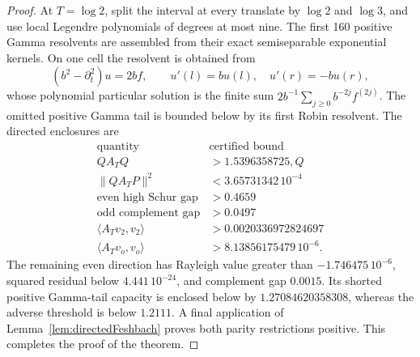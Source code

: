 \documentclass[11pt]{amsart}
\theoremstyle{definition}
\theoremstyle{remark}
\begin{document}
\begin{proof}
At \(T=\log2\), split the interval at every translate by \(\log2\) and
\(\log3\), and use local Legendre polynomials of degrees at most nine.
The first 160 positive Gamma resolvents are assembled from their exact
semiseparable exponential kernels.  On one cell the resolvent is obtained
from
\[
 (b^2-\partial_t^2)u=2bf,\qquad
 u'(l)=bu(l),\quad u'(r)=-bu(r),
\]
whose polynomial particular solution is the finite sum
\(2b^{-1}\sum_{j\ge0}b^{-2j}f^{(2j)}\).  The omitted positive Gamma tail is
bounded below by its first Robin resolvent.  The directed enclosures are
\[
\begin{array}{c|c}
\text{quantity}&\text{certified bound}\\ \hline
 QA_TQ&>1.5396358725,Q\\
 \|QA_TP\|^2&<3.65731342\,10^{-4}\\
 \text{even high Schur gap}&>0.4659\\
 \text{odd complement gap}&>0.0497\\
 \langle A_Tv_2,v_2\rangle&>0.0020336972824697\\
 \langle A_Tv_o,v_o\rangle&>8.13856175479\,10^{-6}.
\end{array}
\]
The remaining even direction has Rayleigh value greater than
\(-1.746475\,10^{-6}\), squared residual below
\(4.441\,10^{-24}\), and complement gap \(0.0015\).  Its shorted positive
Gamma-tail capacity is enclosed below by \(1.27084620358308\), whereas the
adverse threshold is below \(1.2111\).  A final application of
Lemma~\ref{lem:directedFeshbach} proves both parity restrictions positive.
This completes the proof of the theorem.
\end{proof}
\end{document}

